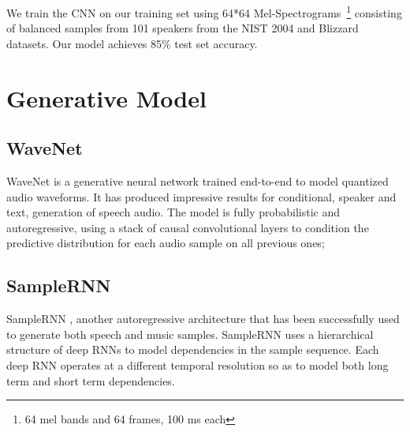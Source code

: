 We train the CNN on our training set using 64*64 Mel-Spectrograms~\footnote{64 mel bands and 64 frames, 100 ms each} consisting of balanced samples from 101 speakers from the NIST 2004 and Blizzard datasets. Our model achieves 85\% test set accuracy.

\section{Generative Model}
\subsection{WaveNet} %
\label{sub:WaveNet}
WaveNet is a generative neural network trained end-to-end to model quantized audio waveforms. It has produced impressive results for conditional, speaker and text, generation of speech audio. The model is fully probabilistic and autoregressive, using a stack of causal convolutional layers to condition the predictive distribution for each audio sample on all previous ones;
\subsection{SampleRNN}
SampleRNN \cite{mehri2016samplernn}, another autoregressive architecture that has been successfully used to generate both speech and music samples. SampleRNN uses a hierarchical structure of deep RNNs to model dependencies in the sample sequence. Each deep RNN operates at a different temporal resolution so as to model both long term and short term dependencies.  
